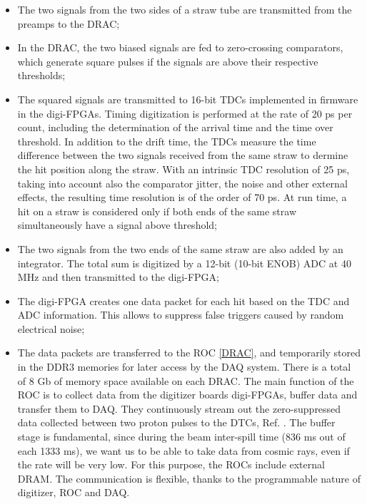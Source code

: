 \begin{itemize}
    \item The two signals from the two sides of a straw tube are transmitted 
    from the preamps to the DRAC;
    \item In the DRAC, the two biased signals are fed to zero-crossing comparators, 
    which generate square pulses if the signals are above their respective thresholds;
    \item The squared signals are transmitted to 16-bit TDCs implemented 
    in firmware in the digi-FPGAs. Timing digitization is performed at the rate 
    of 20 ps per count, including the determination of the arrival time and the 
    time over threshold. In addition to the drift time, the TDCs 
    measure the time difference between the two signals received from the 
    same straw to dermine the hit position along the straw. With an 
    intrinsic TDC resolution of 25 ps, taking into account also the comparator jitter, 
    the noise and other external effects, the resulting time resolution 
    is of the order of 70 ps. At run time, a hit on a straw 
    is considered only if both ends of the same straw simultaneously have a 
    signal above threshold;
    \item The two signals from the two ends of the same straw are also 
    added by an integrator. The total sum is digitized by a 12-bit 
    (10-bit ENOB) ADC at 40 MHz and then transmitted to the digi-FPGA;
    \item The digi-FPGA creates one data packet for each hit based on the 
    TDC and ADC information. This allows to suppress false triggers caused by 
    random electrical noise;
    \item The data packets are transferred to the ROC \ref{DRAC}, and 
    temporarily stored in the DDR3 memories for later access by the DAQ system. 
    There is a total of 8 Gb of memory space available on each DRAC. 
    The main function of the ROC is to collect data from the digitizer boards 
    digi-FPGAs, buffer data and transfer them to DAQ. They continuously stream out 
    the zero-suppressed data collected between two proton pulses to the DTCs, 
    Ref. \cite{GIOIOSA2023167732}. The buffer stage is fundamental, 
    since during the beam inter-spill time (836 ms out of each 1333 ms), 
    we want us to be able to take data from cosmic rays, even if the rate 
    will be very low. For this purpose, the ROCs include external DRAM. 
    The communication is flexible, thanks to the 
    programmable nature of digitizer, ROC and DAQ.
\end{itemize}


